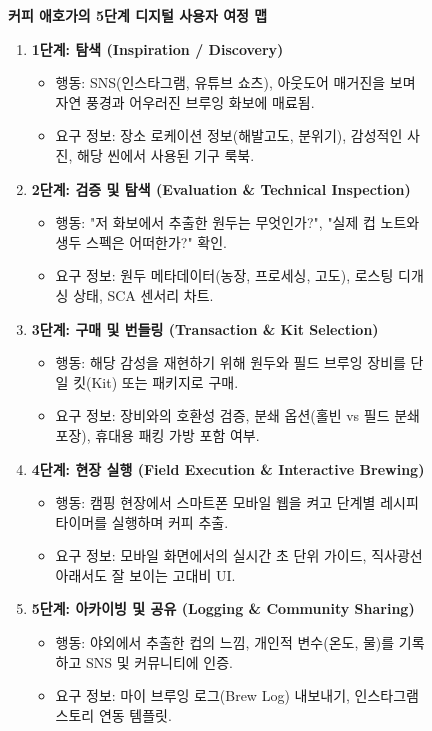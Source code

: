 \documentclass[10pt,a4paper]{article}
\begin{document}
\begin{figure}[h!]
\centering
\begin{tcolorbox}[colback=white,colframe=BorderGray,width=0.96\textwidth]
\textbf{\large 커피 애호가의 5단계 디지털 사용자 여정 맵}
\vspace{6pt}
\begin{enumerate}[itemsep=6pt]
    \item \textbf{1단계: 탐색 (Inspiration / Discovery)}
    \begin{itemize}[itemsep=1pt]
        \item 행동: SNS(인스타그램, 유튜브 쇼츠), 아웃도어 매거진을 보며 자연 풍경과 어우러진 브루잉 화보에 매료됨.
        \item 요구 정보: 장소 로케이션 정보(해발고도, 분위기), 감성적인 사진, 해당 씬에서 사용된 기구 룩북.
    \end{itemize}
    \item \textbf{2단계: 검증 및 탐색 (Evaluation \& Technical Inspection)}
    \begin{itemize}[itemsep=1pt]
        \item 행동: "저 화보에서 추출한 원두는 무엇인가?", "실제 컵 노트와 생두 스펙은 어떠한가?" 확인.
        \item 요구 정보: 원두 메타데이터(농장, 프로세싱, 고도), 로스팅 디개싱 상태, SCA 센서리 차트.
    \end{itemize}
    \item \textbf{3단계: 구매 및 번들링 (Transaction \& Kit Selection)}
    \begin{itemize}[itemsep=1pt]
        \item 행동: 해당 감성을 재현하기 위해 원두와 필드 브루잉 장비를 단일 킷(Kit) 또는 패키지로 구매.
        \item 요구 정보: 장비와의 호환성 검증, 분쇄 옵션(홀빈 vs 필드 분쇄 포장), 휴대용 패킹 가방 포함 여부.
    \end{itemize}
    \item \textbf{4단계: 현장 실행 (Field Execution \& Interactive Brewing)}
    \begin{itemize}[itemsep=1pt]
        \item 행동: 캠핑 현장에서 스마트폰 모바일 웹을 켜고 단계별 레시피 타이머를 실행하며 커피 추출.
        \item 요구 정보: 모바일 화면에서의 실시간 초 단위 가이드, 직사광선 아래서도 잘 보이는 고대비 UI.
    \end{itemize}
    \item \textbf{5단계: 아카이빙 및 공유 (Logging \& Community Sharing)}
    \begin{itemize}[itemsep=1pt]
        \item 행동: 야외에서 추출한 컵의 느낌, 개인적 변수(온도, 물)를 기록하고 SNS 및 커뮤니티에 인증.
        \item 요구 정보: 마이 브루잉 로그(Brew Log) 내보내기, 인스타그램 스토리 연동 템플릿.
    \end{itemize}
\end{enumerate}
\end{tcolorbox}
\end{figure}
\end{document}
